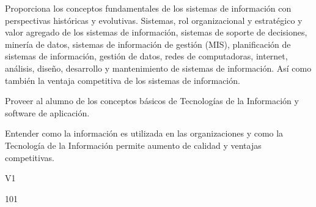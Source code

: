 \begin{syllabus}


\begin{justification}
Proporciona los conceptos fundamentales de los sistemas de información con perspectivas históricas y evolutivas. Sistemas, rol organizacional y estratégico y valor agregado de los sistemas de información, sistemas de soporte de decisiones, minería de datos, sistemas de información de gestión (MIS), planificación de sistemas de información, gestión de datos, redes de computadoras, internet, análisis, diseño, desarrollo y mantenimiento de sistemas de información. Así como también la ventaja competitiva de los sistemas de información.
\end{justification}

\begin{goals}
\item Proveer al alumno de los conceptos básicos de Tecnologías de la Información y software de aplicación.
\item Entender como la información es utilizada en las organizaciones y como la Tecnología de la Información permite aumento de calidad y ventajas competitivas.
\end{goals}

\begin{outcomes}{V1}
   \item {}
   \item {}
   \item {}
   \item {}
   \item {}
   \item {}
   \item {}
   \item {}
\end{outcomes}

\begin{unit}{\LUFIVEDef}{}{\LUFIVEBib}{10}{1}
   \begin{topics}
      \item \OMCTWOTopicTWOxTWOxONEOH
      \item \TDSONETopicTHREExONExONE
      \item \TDSONETopicTHREExONExTWO
      \item \TDSONETopicTHREExONExTHREE
      \item \TDSONETopicTHREExONExFOUR
      \item \TDSONETopicTHREExONExFIVE
   \end{topics}
	\LUFIVEGoal
\end{unit}


\end{syllabus}
